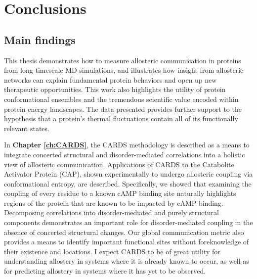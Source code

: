 \documentclass[../main.tex]{subfiles}
\begin{document}
    \chapter{Conclusions}
    \label{ch:chapter8}
    \captionsetup{labelfont=bf}
    \graphicspath{{Chapter8/}}

    
    \section{Main findings}
        This thesis demonstrates how to measure allosteric communication in proteins from long-timescale MD simulations, and illustrates how insight from allosteric networks can explain fundamental protein behaviors and open up new therapeutic opportunities. This work also highlights the utility of protein conformational ensembles and the tremendous scientific value encoded within protein energy landscapes. The data presented provides further support to the hypothesis that a protein’s thermal fluctuations contain all of its functionally relevant states.

        In \textbf{Chapter \ref{ch:CARDS}}, the CARDS methodology is described as a means to integrate concerted structural and disorder-mediated correlations into a holistic view of allosteric communication. Applications of CARDS to the Catabolite Activator Protein (CAP), shown experimentally to undergo allosteric coupling via conformational entropy, are described. Specifically, we showed that examining the coupling of every residue to a known cAMP binding site naturally highlights regions of the protein that are known to be impacted by cAMP binding. Decomposing correlations into disorder-mediated and purely structural components demonstrates an important role for disorder-mediated coupling in the absence of concerted structural changes. Our global communication metric also provides a means to identify important functional sites without foreknowledge of their existence and locations. I expect CARDS to be of great utility for understanding allostery in systems where it is already known to occur, as well as for predicting allostery in systems where it has yet to be observed.
\end{document}

